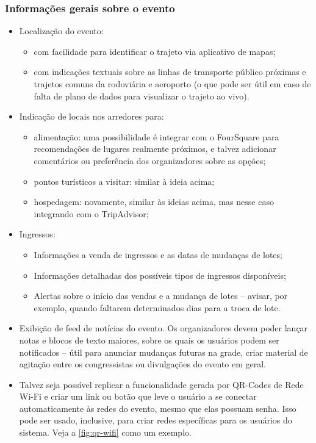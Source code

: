\documentclass[12pt,a4paper,twoside,hyphens,english,brazil]{abntex2}
\begin{document}
\subsubsection*{Informações gerais sobre o evento}
\begin{itemize}
	\item Localização do evento:
		\begin{itemize}
			\item com facilidade para identificar o trajeto via aplicativo de mapas;
			\item com indicações textuais sobre as linhas de transporte público próximas e trajetos comuns da rodoviária e aeroporto (o que pode ser útil em caso de falta de plano de dados para visualizar o trajeto ao vivo).
		\end{itemize}
	\item Indicação de locais nos arredores para:
		\begin{itemize}
			\item alimentação: uma possibilidade é integrar com o FourSquare para recomendações de lugares realmente próximos, e talvez adicionar comentários ou preferência dos organizadores sobre as opções;
			\item pontos turísticos a visitar: similar à ideia acima;
			\item hospedagem: novamente, similar às ideias acima, mas nesse caso integrando com o TripAdvisor;
		\end{itemize}
	\item Ingressos:
	\begin{itemize}
		\item Informações a venda de ingressos e as datas de mudanças de lotes;
		\item Informações detalhadas dos possíveis tipos de ingressos disponíveis;
		\item Alertas sobre o início das vendas e a mudança de lotes -- avisar, por exemplo, quando faltarem determinados dias para a troca de lote.
	\end{itemize}
	\item Exibição de feed de notícias do evento. Os organizadores devem poder lançar notas e blocos de texto maiores, sobre os quais os usuários podem ser notificados -- útil para anunciar mudanças futuras na grade, criar material de agitação entre os congressistas ou divulgações do evento em geral. 
	\item Talvez seja possível replicar a funcionalidade gerada por QR-Codes de Rede Wi-Fi e criar um link ou botão que leve o usuário a se conectar automaticamente às redes do evento, mesmo que elas possuam senha. Isso pode ser usado, inclusive, para criar redes específicas para os usuários do sistema. Veja a \autoref{fig:qr-wifi} como um exemplo.
\end{itemize}
\end{document}
